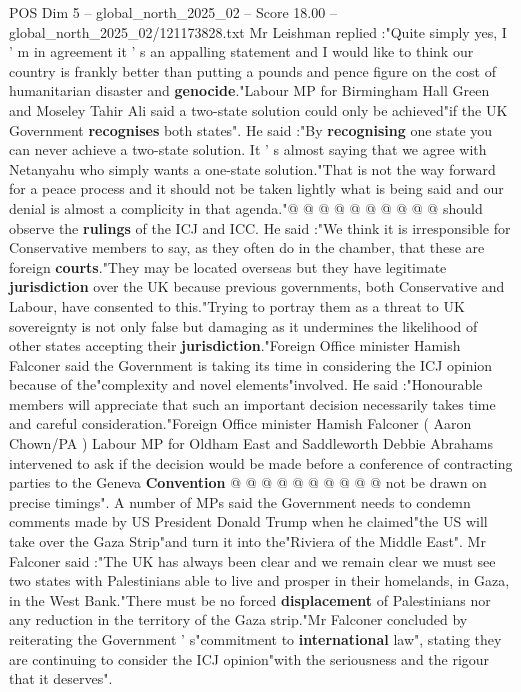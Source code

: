 \begin{textsample}{POS Dim 5 – global\_north\_2025\_02 – Score 18.00 – global\_north\_2025\_02/121173828.txt}
Mr Leishman replied :"Quite simply yes, I ' m in agreement it ' s an appalling statement and I would like to think our country is frankly better than putting a pounds and pence figure on the cost of humanitarian disaster and \textbf{genocide}."Labour MP for Birmingham Hall Green and Moseley Tahir Ali said a two-state solution could only be achieved"if the UK Government \textbf{recognises} both states".
He said :"By \textbf{recognising} one state you can never achieve a two-state solution.
It ' s almost saying that we agree with Netanyahu who simply wants a one-state solution."That is not the way forward for a peace process and it should not be taken lightly what is being said and our denial is almost a complicity in that agenda."@ @ @ @ @ @ @ @ @ @ should observe the \textbf{rulings} of the ICJ and ICC.
He said :"We think it is irresponsible for Conservative members to say, as they often do in the chamber, that these are foreign \textbf{courts}."They may be located overseas but they have legitimate \textbf{jurisdiction} over the UK because previous governments, both Conservative and Labour, have consented to this."Trying to portray them as a threat to UK sovereignty is not only false but damaging as it undermines the likelihood of other states accepting their \textbf{jurisdiction}."Foreign Office minister Hamish Falconer said the Government is taking its time in considering the ICJ opinion because of the"complexity and novel elements"involved.
He said :"Honourable members will appreciate that such an important decision necessarily takes time and careful consideration."Foreign Office minister Hamish Falconer ( Aaron Chown/PA ) Labour MP for Oldham East and Saddleworth Debbie Abrahams intervened to ask if the decision would be made before a conference of contracting parties to the Geneva \textbf{Convention} @ @ @ @ @ @ @ @ @ @ not be drawn on precise timings".
A number of MPs said the Government needs to condemn comments made by US President Donald Trump when he claimed"the US will take over the Gaza Strip"and turn it into the"Riviera of the Middle East".
Mr Falconer said :"The UK has always been clear and we remain clear we must see two states with Palestinians able to live and prosper in their homelands, in Gaza, in the West Bank."There must be no forced \textbf{displacement} of Palestinians nor any reduction in the territory of the Gaza strip."Mr Falconer concluded by reiterating the Government ' s"commitment to \textbf{international} law", stating they are continuing to consider the ICJ opinion"with the seriousness and the rigour that it deserves".

\end{textsample}
